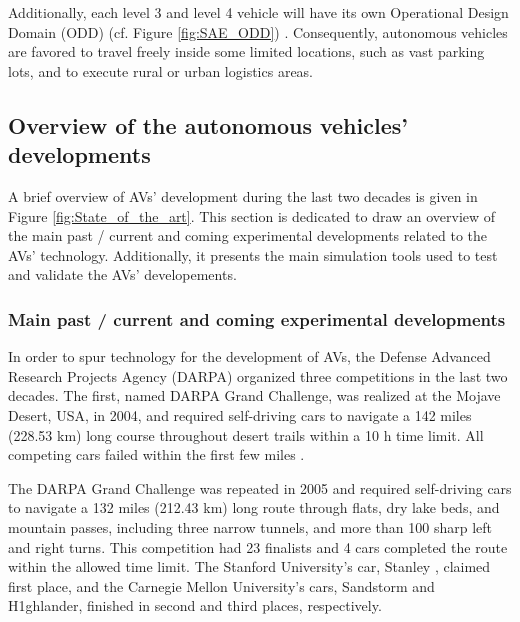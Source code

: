  
 Additionally, each level 3 and level 4 vehicle will have its own Operational Design Domain (ODD) (cf. Figure \ref{fig:SAE_ODD}) \cite{sae2018taxonomy}\cite{2018SURFACEVR}. Consequently, autonomous vehicles are favored to travel freely inside some limited locations, such as vast parking lots, and to execute rural or urban logistics areas. 








 




\subsection{Overview of the autonomous vehicles' developments} \label{sec:AV_state_of_the_art}
A brief overview of AVs' development during the last two decades is given in Figure \ref{fig:State_of_the_art}. This section is dedicated to draw an overview of the main past / current and coming experimental developments related to the AVs' technology. Additionally, it presents the main simulation tools used to test and validate the AVs' developements. 

 
\subsubsection{Main past / current and coming experimental developments}
 In order to spur technology for the development of AVs, the Defense Advanced Research Projects Agency (DARPA) organized three competitions in the last two decades. The first, named DARPA Grand Challenge, was realized at the Mojave Desert, USA, in 2004, and required self-driving cars to navigate a 142 miles (228.53 km) long course throughout desert trails within a 10 h time limit. All competing cars failed within the first few miles \cite{BADUE2021113816}. 

The DARPA Grand Challenge was repeated in 2005 and required self-driving cars to navigate a 132 miles (212.43 km) long route through flats, dry lake beds, and mountain passes, including three narrow tunnels, and more than 100 sharp left and right turns. This competition had 23 finalists and 4 cars completed the route within the allowed time limit. The Stanford University's car, Stanley \cite{Thrun2007}, claimed first place, and the Carnegie Mellon University's cars, Sandstorm and H1ghlander, finished in second and third places, respectively. 

